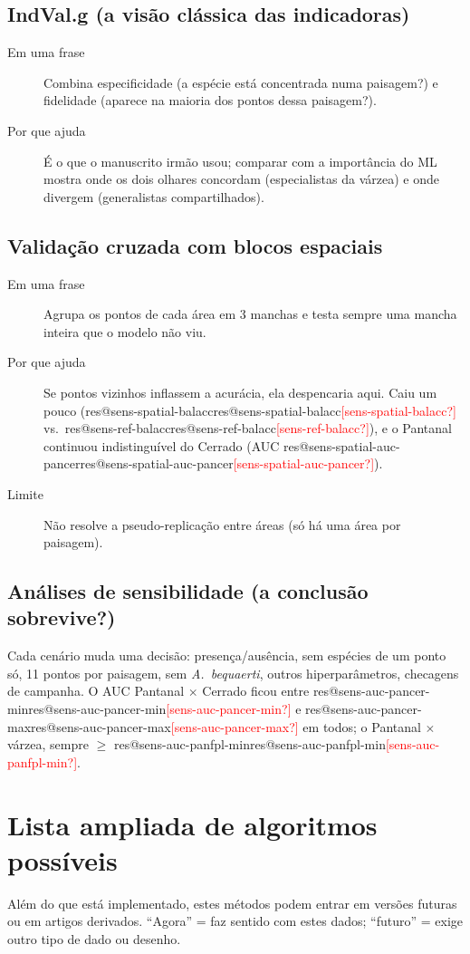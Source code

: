 \documentclass[11pt,a4paper]{article}
\makeatletter
\newcommand{\res}[1]{\ifcsname res@#1\endcsname\csname res@#1\endcsname\else\textcolor{red}{[#1?]}\fi}
\newcommand{\taxon}[1]{\textit{#1}}
\makeatother
\begin{document}
\subsection{IndVal.g (a visão clássica das indicadoras)}
\begin{description}
\item[Em uma frase] Combina especificidade (a espécie está concentrada numa paisagem?) e
fidelidade (aparece na maioria dos pontos dessa paisagem?).
\item[Por que ajuda] É o que o manuscrito irmão usou; comparar com a importância do ML mostra onde
os dois olhares concordam (especialistas da várzea) e onde divergem (generalistas compartilhados).
\end{description}

\subsection{Validação cruzada com blocos espaciais}\label{sec:blocos}
\begin{description}
\item[Em uma frase] Agrupa os pontos de cada área em 3 manchas e testa sempre uma mancha inteira
que o modelo não viu.
\item[Por que ajuda] Se pontos vizinhos inflassem a acurácia, ela despencaria aqui. Caiu um pouco
(\res{sens-spatial-balacc} vs.\ \res{sens-ref-balacc}), e o Pantanal continuou indistinguível do
Cerrado (AUC \res{sens-spatial-auc-pancer}).
\item[Limite] Não resolve a pseudo-replicação entre áreas (só há uma área por paisagem).
\end{description}

\subsection{Análises de sensibilidade (a conclusão sobrevive?)}
Cada cenário muda uma decisão: presença/ausência, sem espécies de um ponto só, 11 pontos por
paisagem, sem \taxon{A.~bequaerti}, outros hiperparâmetros, checagens de campanha. O AUC
Pantanal $\times$ Cerrado ficou entre \res{sens-auc-pancer-min} e \res{sens-auc-pancer-max} em
todos; o Pantanal $\times$ várzea, sempre $\geq$ \res{sens-auc-panfpl-min}.

\section{Lista ampliada de algoritmos possíveis}
Além do que está implementado, estes métodos podem entrar em versões futuras ou em artigos
derivados. ``Agora'' = faz sentido com estes dados; ``futuro'' = exige outro tipo de dado ou
desenho.
\end{document}
